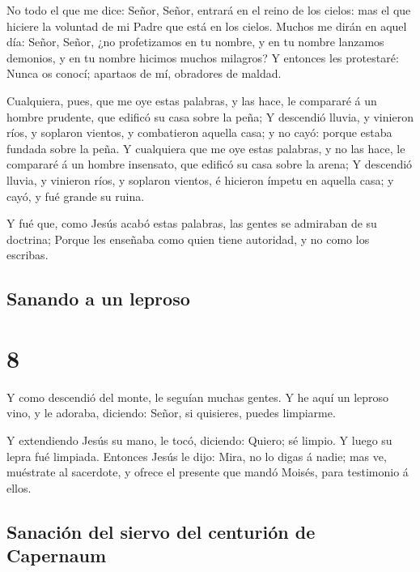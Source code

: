  No todo el que me dice: Señor, Señor, entrará en el
reino de los cielos: mas el que hiciere la voluntad de mi Padre que está
en los cielos.  Muchos me dirán en aquel día: Señor,
Señor, ¿no profetizamos en tu nombre, y en tu nombre lanzamos demonios,
y en tu nombre hicimos muchos milagros?  Y entonces les
protestaré: Nunca os conocí; apartaos de mí, obradores de maldad.

 Cualquiera, pues, que me oye estas palabras, y las hace,
le compararé á un hombre prudente, que edificó su casa sobre la peña;
 Y descendió lluvia, y vinieron ríos, y soplaron vientos,
y combatieron aquella casa; y no cayó: porque estaba fundada sobre la
peña.  Y cualquiera que me oye estas palabras, y no las
hace, le compararé á un hombre insensato, que edificó su casa sobre la
arena;  Y descendió lluvia, y vinieron ríos, y soplaron
vientos, é hicieron ímpetu en aquella casa; y cayó, y fué grande su
ruina.

 Y fué que, como Jesús acabó estas palabras, las gentes
se admiraban de su doctrina;  Porque les enseñaba como
quien tiene autoridad, y no como los escribas.

\hypertarget{sanando-a-un-leproso}{%
\subsection{Sanando a un leproso}\label{sanando-a-un-leproso}}

\hypertarget{section-40-8}{%
\section{8}\label{section-40-8}}

 Y como descendió del monte, le seguían muchas gentes.
 Y he aquí un leproso vino, y le adoraba, diciendo: Señor,
si quisieres, puedes limpiarme.

 Y extendiendo Jesús su mano, le tocó, diciendo: Quiero;
sé limpio. Y luego su lepra fué limpiada.  Entonces Jesús
le dijo: Mira, no lo digas á nadie; mas ve, muéstrate al sacerdote, y
ofrece el presente que mandó Moisés, para testimonio á ellos.

\hypertarget{sanaciuxf3n-del-siervo-del-centuriuxf3n-de-capernaum}{%
\subsection{Sanación del siervo del centurión de
Capernaum}\label{sanaciuxf3n-del-siervo-del-centuriuxf3n-de-capernaum}}

